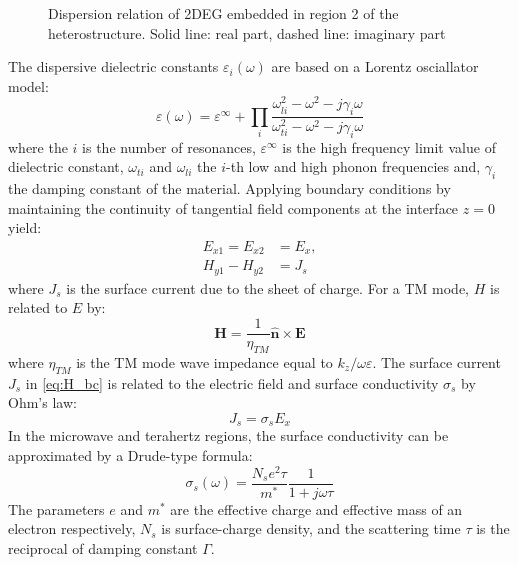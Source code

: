 \documentclass[conference, 10pt]{IEEEtran}
\renewcommand{\v}[1]{\mathbf{#1}} %
\renewcommand{\O}{\omega}  %
\newcommand{\E}{\varepsilon}  %
\renewcommand{\inf}{\infty}  %
\renewcommand{\^}{\hat}  %
\begin{document}
%
\begin{figure*}[!t]
\centering
\subfloat[Case A]{
\label{fig:disp_Ga}}
\hfil
\subfloat[Case B]{
\label{fig:disp_Sto}}
  \caption{Dispersion relation of 2DEG embedded in region 2 of the heterostructure. Solid line: real part, dashed line: imaginary part}
\label{fig:disp}
\end{figure*}
%
The dispersive dielectric constants $\E_i(\O)$ are based on a Lorentz osciallator model:
%
\begin{equation}
  \E(\O) = \E^{\inf} + \prod_i\frac{\O_{li}^2 - \O^2 - j\gamma_i \O}{\O_{ti}^2 - \O^2 - j\gamma_i \O}
  \label{eq:eps}
\end{equation}
%
where the $i$ is the number of resonances, $\E^{\inf}$ is the high frequency limit value of dielectric constant, $\O_{ti}$ and $\O_{li}$ the $i$-th low and high phonon frequencies and, $\gamma_{i}$ the damping constant of the material. Applying boundary conditions by maintaining the continuity of tangential field components at the interface $z = 0$ yield:
%
\begin{subequations}
  \begin{align}
    E_{x1} =  E_{x2} &= E_x,
    \label{eq:E_bc}\\
    H_{y1} - H_{y2} &= J_s
    \label{eq:H_bc}
  \end{align}
  \label{eq:bc}
\end{subequations}
%
where $J_s$ is the surface current due to the sheet of charge. For a TM mode, $H$ is related to $E$ by:
%
\begin{equation}
  \v H = \frac{1}{\eta_{TM}} \v{\^{n}} \times \v E
  \label{eq:H_TM}
\end{equation}
%
where $\eta_{TM}$ is the TM mode wave impedance equal to $k_{z}/{\O \E}$. The surface current $J_s$ in \eqref{eq:H_bc} is related to the electric field and surface conductivity $\sigma_s$ by Ohm's law:
%
\begin{equation}
  J_s = \sigma_s E_x
  \label{eq:Ohms}
\end{equation}
%
In the microwave and terahertz regions, the surface conductivity can be approximated by a Drude-type formula:
%
\begin{equation}
  \sigma_s(\O) = \frac{N_s e^2 \tau}{m^{\ast}}\frac{1}{1 + j \O \tau}
  \label{eq:conductivity}
\end{equation}
%
The parameters $e$ and $m^*$ are the effective charge and effective mass of an electron respectively, $N_s$ is  surface-charge density, and the scattering time $\tau$ is the reciprocal of damping constant $\Gamma$.
\end{document}
